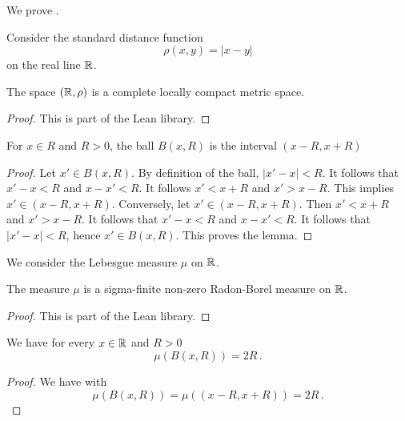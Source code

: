We prove .

Consider the standard distance function
\begin{equation}
    \rho(x,y)=|x-y|
\end{equation}
on the real line ${\mathbb{R}}$.
\begin{lemma}
\label{real-line-metric}
\leanok
{}
The space $({\mathbb{R}},\rho)$ is a complete locally compact metric space.
\end{lemma}
\begin{proof}
    \leanok
    This is part of the Lean library.
\end{proof}
\begin{lemma}
\label{real-line-ball}
    \leanok
    For $x\in R$ and $R>0$, the ball $B(x,R)$ is the interval $(x-R,x+R)$
\end{lemma}
\begin{proof}
\leanok
Let $x'\in B(x,R)$. By definition of the ball,
$|x'-x|<R$. It follows that $x'-x<R$ and $x-x'<R$.
It follows $x'<x+R$ and $x'>x-R$. This implies
$x'\in (x-R,x+R)$.
Conversely, let $x'\in (x-R,x+R)$. Then
$x'<x+R$ and $x'>x-R$. It follows that
$x'-x<R$ and $x-x'<R$. It follows that $|x'-x|<R$,
hence $x'\in B(x,R)$.
This proves the lemma.
\end{proof}
We consider the Lebesgue measure $\mu$ on ${\mathbb{R}}$.
\begin{lemma}
\label{real-line-measure}
\leanok
{}
    The measure $\mu$ is a sigma-finite non-zero
    Radon-Borel measure on ${\mathbb{R}}$.
\end{lemma}
\begin{proof}
    \leanok
    This is part of the Lean library.
\end{proof}
\begin{lemma}
\label{real-line-ball-measure}
    \leanok
    We have for every $x\in {\mathbb{R}}$ and $R>0$
    \begin{equation}
        \mu(B(x,R))=2R\, .
    \end{equation}
\end{lemma}
\begin{proof}
\leanok
We have with 
\begin{equation}
    \mu(B(x,R))=\mu((x-R,x+R))=2R\, .
\end{equation}
\end{proof}

